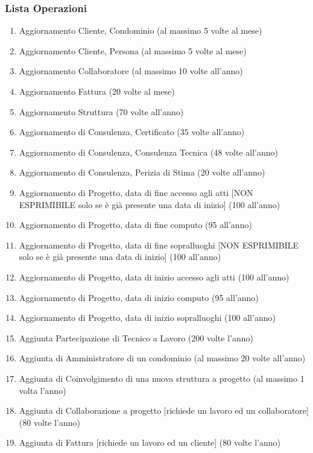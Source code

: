 \documentclass{elegantbook}
\begin{document}
	\subsubsection{Lista Operazioni}
        \label{subsec:listOperazioni}
        \begin{enumerate}
		\item Aggiornamento Cliente, Condominio (al massimo 5 volte al mese)
		\item Aggiornamento Cliente, Persona (al massimo 5 volte al mese)
		\item Aggiornamento Collaboratore (al massimo 10 volte all'anno)
		\item Aggiornamento Fattura (20 volte al mese)
		\item Aggiornamento Struttura (70 volte all'anno)
		\item Aggiornamento di Consulenza, Certificato (35 volte all'anno)
		\item Aggiornamento di Consulenza, Consulenza Tecnica (48 volte all'anno)
		\item Aggiornamento di Consulenza, Perizia di Stima (20 volte all'anno)
		\item Aggiornamento di Progetto, data di fine accesso agli atti [NON ESPRIMIBILE solo se è già presente una data di inizio] (100 all'anno)
		\item Aggiornamento di Progetto, data di fine computo (95 all'anno)
		\item Aggiornamento di Progetto, data di fine sopralluoghi [NON ESPRIMIBILE solo se è già presente una data di inizio] (100 all'anno)
		\item Aggiornamento di Progetto, data di inizio accesso agli atti (100 all'anno)
		\item Aggiornamento di Progetto, data di inizio computo (95 all'anno)
		\item Aggiornamento di Progetto, data di inizio sopralluoghi (100 all'anno)
		\item Aggiunta Partecipazione di Tecnico a Lavoro (200 volte l'anno)
		\item Aggiunta di Amministratore di un condominio (al massimo 20 volte all'anno)
		\item Aggiunta di Coinvolgimento di una nuova struttura a progetto (al massimo 1 volta l'anno)
		\item Aggiunta di Collaborazione a progetto [richiede un lavoro ed un collaboratore] (80 volte l'anno)
		\item Aggiunta di Fattura [richiede un lavoro ed un cliente] (80 volte l'anno)

\end{enumerate}
\end{document}
